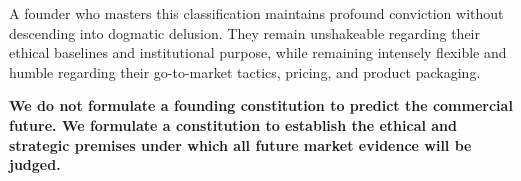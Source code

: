 A founder who masters this classification maintains profound conviction without descending into dogmatic delusion. They remain unshakeable regarding their ethical baselines and institutional purpose, while remaining intensely flexible and humble regarding their go-to-market tactics, pricing, and product packaging.

\textbf{We do not formulate a founding constitution to predict the commercial future. We formulate a constitution to establish the ethical and strategic premises under which all future market evidence will be judged.}
